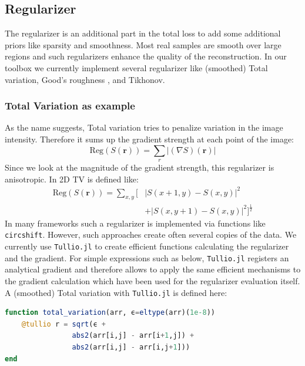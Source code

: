 \documentclass{juliacon}
\begin{document}
\subsection{Regularizer}
    The regularizer is an additional part in the total loss to add some additional priors like sparsity and smoothness.
    Most real samples are smooth over large regions and such regularizers enhance the quality of the reconstruction.
    In our toolbox we currently implement several regularizer like (smoothed) Total variation, Good's roughness \cite{Verveer:98}, \cite{Good:71} and Tikhonov. 
    \subsubsection{Total Variation as example}
        As the name suggests, Total variation tries to penalize variation in the image intensity. Therefore it sums up the gradient strength at each point
        of the image:
        \begin{equation}
            \text{Reg}(S(\mathbf r)) = \sum_r  |(\nabla S)(\mathbf r)|
        \end{equation}
        Since we look at the magnitude of the gradient strength, this regularizer is anisotropic.
        In 2D TV is defined like: 
        \begin{equation}
        \begin{split}
            \text{Reg}(S(\mathbf r)) = \sum_{x,y} \big[& |S(x + 1, y) - S(x, y)|^2 \\ 
                                                & + |S(x, y + 1) - S(x, y)|^2\big]^{\frac12}
        \end{split}
        \end{equation}
        In many frameworks such a regularizer is implemented via functions like \lstinline{circshift}. 
        However, such approaches create often several copies of the data. 
        We currently use \verb|Tullio.jl|\cite{michael_abbott_2021_5047410} to create efficient functions 
        calculating the regularizer and the gradient. For simple expressions
        such as below, \verb|Tullio.jl| registers an analytical gradient and therefore allows to apply the same efficient mechanisms 
        to the gradient calculation which have been used for the regularizer evaluation itself.
        A (smoothed) Total variation with \verb|Tullio.jl| is defined here:
        \begin{lstlisting}[language = Julia]
function total_variation(arr, ϵ=eltype(arr)(1e-8))
    @tullio r = sqrt(ϵ + 
                abs2(arr[i,j] - arr[i+1,j]) +
                abs2(arr[i,j] - arr[i,j+1]))
end
        \end{lstlisting}
\end{document}

